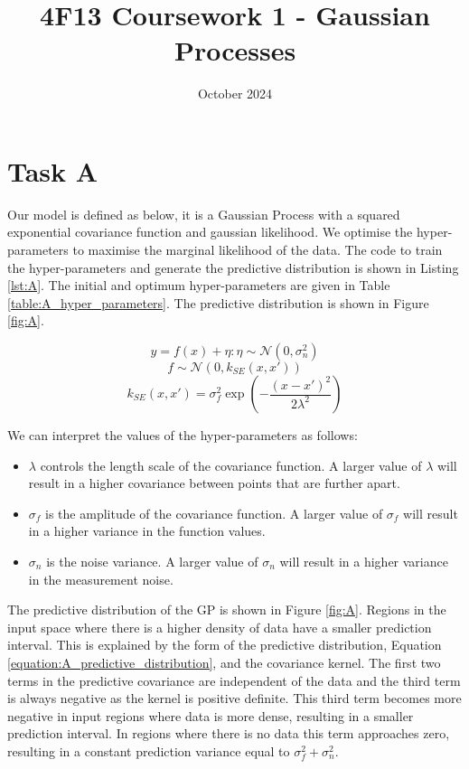 \documentclass[11pt, twocolumn]{article}
\title{\vspace{-2cm}4F13 Coursework 1 - Gaussian Processes}
\author{}
\date{October 2024}
\begin{document}
\maketitle
\section{Task A}

Our model is defined as below, it is a Gaussian Process with a squared exponential covariance function and gaussian likelihood. We optimise the hyper-parameters to maximise the marginal likelihood of the data. The code to train the hyper-parameters and generate the predictive distribution is shown in Listing \ref{lst:A}. The initial and optimum hyper-parameters are given in Table \ref{table:A_hyper_parameters}. The predictive distribution is shown in Figure \ref{fig:A}.

\[y = f(x) + \eta : \eta \sim \mathcal{N}(0, \sigma_n^2)\]
\[f \sim \mathcal{N}(0, k_{SE}(x, x'))\]
\[k_{SE}(x,x') = \sigma_f^2 \exp(-\frac{(x-x')^2}{2\lambda^2})\]

We can interpret the values of the hyper-parameters as follows:
\begin{itemize}
    \item $\lambda$ controls the length scale of the covariance function. A larger value of $\lambda$ will result in a higher covariance between points that are further apart.
    \item $\sigma_f$ is the amplitude of the covariance function. A larger value of $\sigma_f$ will result in a higher variance in the function values.
    \item $\sigma_n$ is the noise variance. A larger value of $\sigma_n$ will result in a higher variance in the measurement noise.
\end{itemize}

The predictive distribution of the GP is shown in Figure \ref{fig:A}. Regions in the input space where there is a higher density of data have a smaller prediction interval. This is explained by the form of the predictive distribution, Equation \ref{equation:A_predictive_distribution}, and the covariance kernel. The first two terms in the predictive covariance are independent of the data and the third term is always negative as the kernel is positive definite. This third term becomes more negative in input regions where data is more dense, resulting in a smaller prediction interval. In regions where there is no data this term approaches zero, resulting in a constant prediction variance equal to $\sigma_f^2 + \sigma_n^2$.
\end{document}
